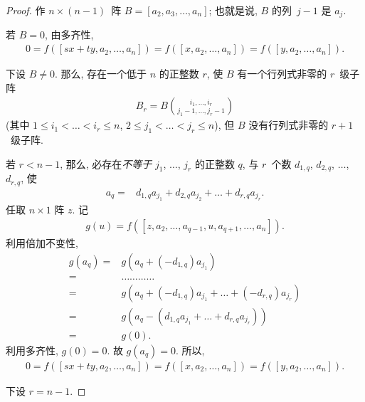 \begin{proof}
    作 \(n \times (n-1)\)~阵
    \(B = [a_2, a_3, \dots, a_n]\);
    也就是说, \(B\) 的列~\(j-1\) 是 \(a_j\).

    若 \(B = 0\),
    由多齐性,
    \begin{align*}
        0 = f {([sx + ty, a_2, \dots, a_n])}
        = f {([x, a_2, \dots, a_n])}
        = f {([y, a_2, \dots, a_n])}.
    \end{align*}

    下设 \(B \neq 0\).
    那么, 存在一个低于 \(n\) 的正整数 \(r\),
    使 \(B\) 有一个行列式非零的 \(r\)~级子阵
    \begin{align*}
        B_r = B\binom{i_1,\dots,i_r}{j_1-1,\dots,j_r-1}
    \end{align*}
    (其中
    \(1 \leq i_1 < \dots < i_r \leq n\),
    \(2 \leq j_1 < \dots < j_r \leq n\)),
    但 \(B\) 没有行列式非零的 \(r+1\)~级子阵.

    若 \(r < n-1\), 那么,
    必存在\emph{不等于}
    \(j_1\), \(\dots\), \(j_r\) 的正整数 \(q\),
    与 \(r\)~个数
    \(d_{1,q}\), \(d_{2,q}\), \(\dots\), \(d_{r,q}\),
    使
    \begin{align*}
        a_q
        = {} &
        d_{1,q} a_{j_1}
        + d_{2,q} a_{j_2}
        + \dots
        + d_{r,q} a_{j_r}.
    \end{align*}
    任取 \(n \times 1\) 阵 \(z\).
    记
    \begin{align*}
        g(u)
        = f ([z, a_2, \dots, a_{q-1}, u, a_{q+1}, \dots, a_n]).
    \end{align*}
    利用倍加不变性,
    \begin{align*}
        g(a_q)
        = {} & g(a_q + (-d_{1,q})a_{j_1}) \\
        = {} & \dots \dots \dots \dots    \\
        = {} & g(a_q + (-d_{1,q})a_{j_1}
        + \dots + (-d_{r,q})a_{j_r})      \\
        = {} & g(a_q - (d_{1,q} a_{j_1}
        + \dots + d_{r,q} a_{j_r}))       \\
        = {} & g(0).
    \end{align*}
    利用多齐性, \(g(0) = 0\).
    故 \(g(a_q) = 0\).
    所以,
    \begin{align*}
        0 = f {([sx + ty, a_2, \dots, a_n])}
        = f {([x, a_2, \dots, a_n])}
        = f {([y, a_2, \dots, a_n])}.
    \end{align*}

    下设 \(r = n-1\).


\end{proof}
